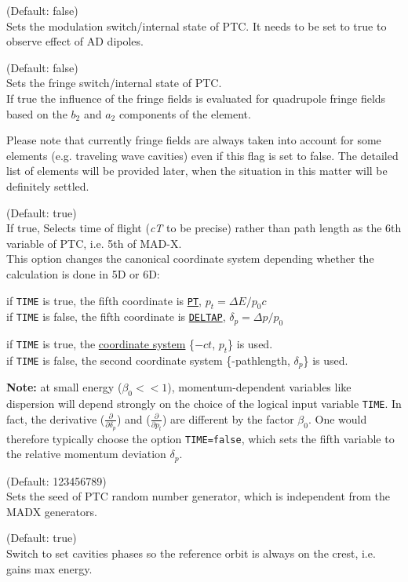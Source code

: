 \begin{madlist}
	 (Default: false)\\
	Sets the modulation switch/internal state of PTC.
	It needs to be set to true to observe effect of AD dipoles.

	 (Default: false)\\
	Sets the fringe switch/internal state of PTC. \\
	If true the influence of the fringe fields is evaluated for quadrupole fringe fields based on the $b_2$ and $a_2$ components of the element.

	Please note that currently fringe fields are always taken into
	account for some elements (e.g. traveling wave cavities) even if
	this flag is set to false. The detailed list of elements
	will be provided later, when the situation in this matter will be
	definitely settled.

	 (Default: true)\\
	If true, Selects time of flight (\textit{cT} to be precise) rather
	than path length as the 6th variable of PTC, i.e. 5th of MAD-X. \\
                    This option changes the canonical coordinate system depending
	whether the calculation is done in 5D or 6D:
	 \begin{madlist}
	    if \texttt{TIME} is true, the fifth coordinate is
	   \hyperref[subsec:tables-canon]{\texttt{PT}},
	   $p_t = \Delta E / p_0 c$ \\
	   if \texttt{TIME} is false, the fifth coordinate is
	   \hyperref[subsec:tables-canon]{\texttt{DELTAP}},
	   $\delta_p = \Delta p / p_0$

	    if \texttt{TIME} is true, the
	   \hyperref[subsec:tables-canon]{\madx coordinate system}
	   \{$-ct$, $p_t$\} is used. \\
	   if \texttt{TIME} is false, the second \ptc coordinate system
	   \{-pathlength, $\delta_p$\} is used.
	 \end{madlist}

	\textbf{Note:} at small energy ($\beta_0 << 1$),
	momentum-dependent variables like dispersion will depend  strongly on
	the choice of  the logical input variable \texttt{TIME}. In fact, the
	derivative ($\frac{\partial}{\partial \delta_p}$)  and
	($\frac{\partial}{\partial p_t}$)  are different by the
	factor $\beta_0$. One would  therefore typically  choose
	the option \texttt{TIME=false},  which sets the fifth variable to
	the relative momentum deviation $\delta_p$.


	 (Default: 123456789)\\
	Sets the seed of PTC random number generator,
	which is independent from the MADX generators.

	 (Default: true)\\
	Switch to set cavities phases so the reference orbit is always on
	the crest, i.e. gains max energy.


\end{madlist}

